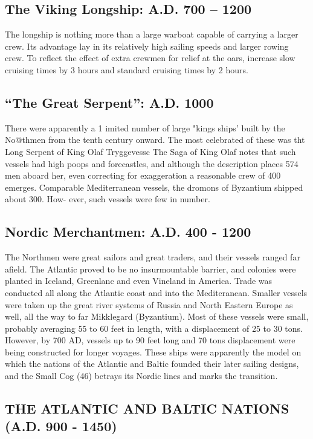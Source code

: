 \documentclass{article}
\begin{document}
\begin{multicols}{3}
\subsection{The Viking Longship: A.D. 700 -- 1200}

The longship is nothing more than a large warboat capable of carrying
a larger crew.  Its advantage lay in its relatively high sailing
speeds and larger rowing crew.  To reflect the effect of extra crewmen
for relief at the oars, increase slow cruising times by 3 hours and
standard cruising times by 2 hours.

\subsection{``The Great Serpent'': A.D. 1000}

There were apparently a 1 imited number of large "kings ships' built
by the No@thmen from the tenth century onward. The most celebrated of
these was tht Long Serpent of King Olaf Tryggevessc The Saga of King
Olaf notes that such vessels had high poops and forecastles, and
although the description places 574 men aboard her, even correcting
for exaggeration a reasonable crew of 400 emerges. Comparable
Mediterranean vessels, the dromons of Byzantium shipped about 300.
How- ever, such vessels were few in number.

\subsection{Nordic Merchantmen:  A.D. 400 - 1200}

The Northmen were great sailors and great traders, and their vessels
ranged far afield.  The Atlantic proved to be no insurmountable
barrier, and colonies were planted in Iceland, Greenlanc and even
Vineland in America. Trade was conducted all along the Atlantic coast
and into the Mediteranean.  Smaller vessels were taken up the great
river systems of Russia and North Eastern Europe as well, all the way
to far Mikklegard (Byzantium).  Most of these vessels were small,
probably averaging 55 to 60 feet in length, with a displacement of 25
to 30 tons.  However, by 700 AD, vessels up to 90 feet long and 70
tons displacement were being constructed for longer voyages.  These
ships were apparently the model on which the nations of the Atlantic
and Baltic founded their later sailing designs, and the Small Cog (46)
betrays its Nordic lines and marks the transition.


\subsection{THE ATLANTIC AND BALTIC NATIONS (A.D. 900 - 1450)}


\end{multicols}
\end{document}
